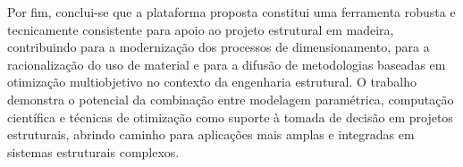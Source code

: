 Por fim, conclui-se que a plataforma proposta constitui uma ferramenta robusta e tecnicamente consistente para apoio ao projeto estrutural em madeira, contribuindo para a modernização dos processos de dimensionamento, para a racionalização do uso de material e para a difusão de metodologias baseadas em otimização multiobjetivo no contexto da engenharia estrutural. O trabalho demonstra o potencial da combinação entre modelagem paramétrica, computação científica e técnicas de otimização como suporte à tomada de decisão em projetos estruturais, abrindo caminho para aplicações mais amplas e integradas em sistemas estruturais complexos.

